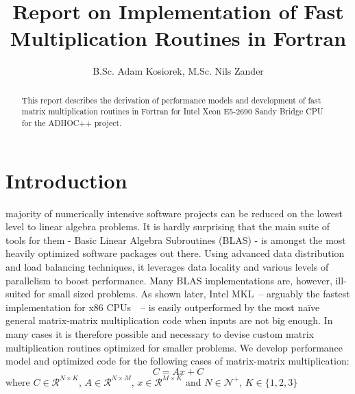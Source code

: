 \documentclass[journal, a4paper]{IEEEtran}
\begin{document}
	\title{Report on Implementation of Fast Multiplication Routines in Fortran}
	\author{B.Sc. Adam Kosiorek, M.Sc. Nils Zander}	
	\maketitle
	


\begin{abstract}
 This report describes the derivation of performance models and development of fast matrix multiplication routines in Fortran for Intel Xeon E5-2690 Sandy Bridge CPU for the ADHOC++ project.
\end{abstract}

\section{Introduction}
     majority of numerically intensive software projects can be reduced on the lowest level to linear algebra problems. It is hardly surprising that the main suite of tools for them - Basic Linear Algebra Subroutines (BLAS) - is amongst the most heavily optimized software packages out there. Using advanced data distribution and load balancing techniques, it leverages data locality and various levels of parallelism to boost performance. Many BLAS implementations are, however, ill-suited for small sized problems. As shown later, Intel MKL~-- arguably the fastest implementation for x86 CPUs~\cite{MKL}~-- is easily outperformed by the most na\"ive general matrix-matrix multiplication code when inputs are not big enough. In many cases it is therefore possible and necessary to devise custom matrix multiplication routines optimized for smaller problems. We develop performance model and optimized code for the following cases of matrix-matrix multiplication:
    \begin{equation}
     C = Ax + C
    \end{equation}
    where $C \in \mathcal{R}^{N \times K}$, $A \in \mathcal{R}^{N \times M}$, $x \in \mathcal{R}^{M \times K}$ and $N \in \mathcal{N}^+$, $K \in \{1, 2, 3\}$
\end{document}
